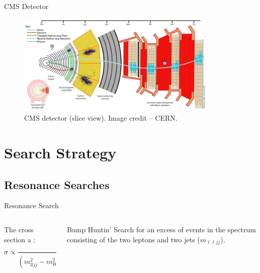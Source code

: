 \documentclass[aspectratio=169]{beamer}
\newcommand{\ssection}[1]{%
  \section{#1}%
  \sectionframe{#1}%
}%
\begin{document}
\begin{frame}{CMS Detector}
  \begin{figure}
    \centering
    \includegraphics[width=0.85\textwidth]{../figures/experiment/cms-slice.png}
    \caption{CMS detector (slice view). Image credit -- CERN.}
  \end{figure}
\end{frame}

\section{Search Strategy} %

\subsection{Resonance Searches}

\begin{frame}{Resonance Search}
  \begin{columns}
    \begin{column}{0.4\textwidth}
      \vfill
      {The cross section a :
      $$
        \sigma \propto \frac{1}{\left(m_{lljj}^{2} - m_{W_R}^{2}\right)^{2} + \Gamma^{2} m^{2}_{W_R}}
      $$}
      \begin{figure}
        \centering
        
      \end{figure}
    \end{column}
    \begin{column}{0.59\textwidth}
      \begin{block}{Bump Huntin'}
        Search for an excess of events in the  
        spectrum consisting of the two leptons and two jets ($m_{\ell \ell j j}$).
      \end{block}
      \begin{figure}
        \centering
        \resizebox{0.9\linewidth}{!}{%
      }
      \end{figure}
    \end{column}
  \end{columns}
\end{frame}
\end{document}
